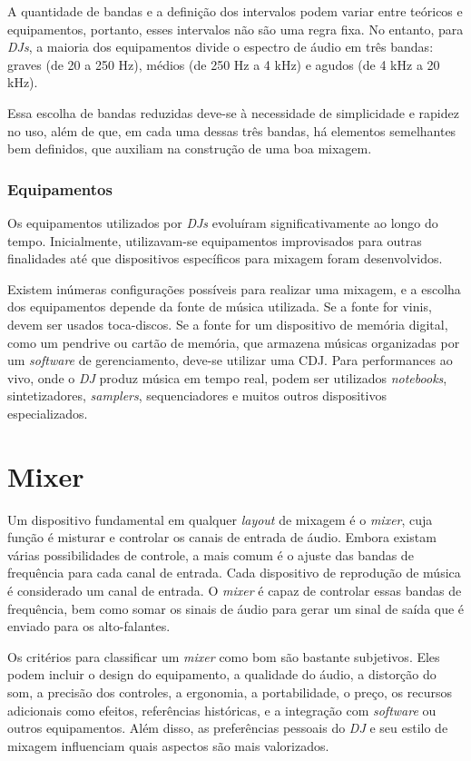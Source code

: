 A quantidade de bandas e a definição dos intervalos podem variar entre teóricos e equipamentos, portanto, esses intervalos não são uma regra fixa. No entanto, para \textit{DJs}, a maioria dos equipamentos divide o espectro de áudio em três bandas: graves (de 20 a 250 Hz), médios (de 250 Hz a 4 kHz) e agudos (de 4 kHz a 20 kHz).

Essa escolha de bandas reduzidas deve-se à necessidade de simplicidade e rapidez no uso, além de que, em cada uma dessas três bandas, há elementos semelhantes bem definidos, que auxiliam na construção de uma boa mixagem.



\subsubsection{Equipamentos}

Os equipamentos utilizados por \textit{DJs} evoluíram significativamente ao longo do tempo. Inicialmente, utilizavam-se equipamentos improvisados para outras finalidades até que dispositivos específicos para mixagem foram desenvolvidos.

Existem inúmeras configurações possíveis para realizar uma mixagem, e a escolha dos equipamentos depende da fonte de música utilizada. Se a fonte for vinis, devem ser usados toca-discos. Se a fonte for um dispositivo de memória digital, como um pendrive ou cartão de memória, que armazena músicas organizadas por um \textit{software} de gerenciamento, deve-se utilizar uma CDJ. Para performances ao vivo, onde o \textit{DJ} produz música em tempo real, podem ser utilizados \textit{notebooks}, sintetizadores, \textit{samplers}, sequenciadores e muitos outros dispositivos especializados.

\section{Mixer}

Um dispositivo fundamental em qualquer \textit{layout} de mixagem é o \textit{mixer}, cuja função é misturar e controlar os canais de entrada de áudio. Embora existam várias possibilidades de controle, a mais comum é o ajuste das bandas de frequência para cada canal de entrada. Cada dispositivo de reprodução de música é considerado um canal de entrada. O \textit{mixer} é capaz de controlar essas bandas de frequência, bem como somar os sinais de áudio para gerar um sinal de saída que é enviado para os alto-falantes.

Os critérios para classificar um \textit{mixer} como bom são bastante subjetivos. Eles podem incluir o design do equipamento, a qualidade do áudio, a distorção do som, a precisão dos controles, a ergonomia, a portabilidade, o preço, os recursos adicionais como efeitos, referências históricas, e a integração com \textit{software} ou outros equipamentos. Além disso, as preferências pessoais do \textit{DJ} e seu estilo de mixagem influenciam quais aspectos são mais valorizados.


